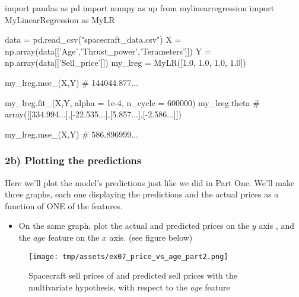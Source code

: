 \documentclass[]{article}
\newenvironment{Shaded}{\begin{snugshade}}{\end{snugshade}}
\newcommand{\CommentTok}[1]{\textcolor[rgb]{0.48,0.49,0.49}{#1}}
\newcommand{\DecValTok}[1]{\textcolor[rgb]{0.96,0.45,0.00}{#1}}
\newcommand{\FloatTok}[1]{\textcolor[rgb]{0.96,0.45,0.00}{#1}}
\newcommand{\ImportTok}[1]{\textcolor[rgb]{0.15,0.68,0.38}{#1}}
\newcommand{\NormalTok}[1]{\textcolor[rgb]{0.81,0.81,0.76}{#1}}
\newcommand{\OperatorTok}[1]{\textcolor[rgb]{0.81,0.81,0.76}{#1}}
\newcommand{\StringTok}[1]{\textcolor[rgb]{0.96,0.31,0.31}{#1}}
\providecommand{\tightlist}{%
  \setlength{\itemsep}{0pt}\setlength{\parskip}{0pt}}
\begin{document}
\begin{Shaded}
\begin{Highlighting}[]
\ImportTok{import}\NormalTok{ pandas }\ImportTok{as}\NormalTok{ pd}
\ImportTok{import}\NormalTok{ numpy }\ImportTok{as}\NormalTok{ np}
\ImportTok{from}\NormalTok{ mylinearregression }\ImportTok{import}\NormalTok{ MyLinearRegression }\ImportTok{as}\NormalTok{ MyLR}

\NormalTok{data }\OperatorTok{=}\NormalTok{ pd.read_csv(}\StringTok{"spacecraft_data.csv"}\NormalTok{)}
\NormalTok{X }\OperatorTok{=}\NormalTok{ np.array(data[[}\StringTok{'Age'}\NormalTok{,}\StringTok{'Thrust_power'}\NormalTok{,}\StringTok{'Terameters'}\NormalTok{]])}
\NormalTok{Y }\OperatorTok{=}\NormalTok{ np.array(data[[}\StringTok{'Sell_price'}\NormalTok{]])}
\NormalTok{my_lreg }\OperatorTok{=}\NormalTok{ MyLR([}\FloatTok{1.0}\NormalTok{, }\FloatTok{1.0}\NormalTok{, }\FloatTok{1.0}\NormalTok{, }\FloatTok{1.0}\NormalTok{])}

\NormalTok{my_lreg.mse_(X,Y)}
\CommentTok{# 144044.877...}

\NormalTok{my_lreg.fit_(X,Y, alpha }\OperatorTok{=} \FloatTok{1e-4}\NormalTok{, n_cycle }\OperatorTok{=} \DecValTok{600000}\NormalTok{)}
\NormalTok{my_lreg.theta}
\CommentTok{# array([[334.994...],[-22.535...],[5.857...],[-2.586...]])}

\NormalTok{my_lreg.mse_(X,Y)}
\CommentTok{# 586.896999...}
\end{Highlighting}
\end{Shaded}

\hypertarget{b-plotting-the-predictions}{%
\subsubsection{2b) Plotting the
predictions}\label{b-plotting-the-predictions}}

Here we'll plot the model's predictions just like we did in Part One.
We'll make three graphs, each one displaying the predictions and the
actual prices as a function of ONE of the features.

\begin{itemize}
\tightlist
\item
  On the same graph, plot the actual and predicted prices on the \(y\)
  axis , and the \(age\) feature on the \(x\) axis. (see figure below)
\end{itemize}

\begin{figure}
\centering
\texttt{[image: tmp/assets/ex07\_price\_vs\_age\_part2.png]}
\caption{Spacecraft sell prices of and predicted sell prices with the
multivariate hypothesis, with respect to the \emph{age} feature}
\end{figure}
\end{document}

